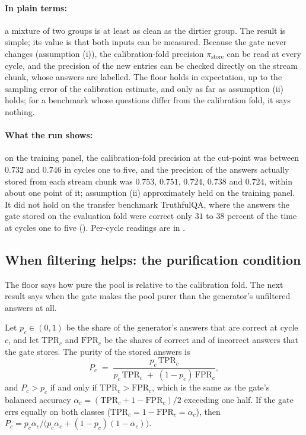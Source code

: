\paragraph{In plain terms:} a mixture of two groups is at least as clean as the dirtier group. The result is simple; its value is that both inputs can be measured. Because the gate never changes (assumption (i)), the calibration-fold precision $\pi_{\text{store}}$ can be read at every cycle, and the precision of the new entries can be checked directly on the stream chunk, whose answers are labelled. The floor holds in expectation, up to the sampling error of the calibration estimate, and only as far as assumption (ii) holds; for a benchmark whose questions differ from the calibration fold, it says nothing.

\paragraph{What the run shows:} on the training panel, the calibration-fold precision at the cut-point was between $0.732$ and $0.746$ in cycles one to five, and the precision of the answers actually stored from each stream chunk was $0.753$, $0.751$, $0.724$, $0.738$ and $0.724$, within about one point of it; assumption (ii) approximately held on the training panel. It did not hold on the transfer benchmark TruthfulQA, where the answers the gate stored on the evaluation fold were correct only $31$ to $38$ percent of the time at cycles one to five (). Per-cycle readings are in .

\subsection{When filtering helps: the purification condition}
\label{sec:theorem-bayes}

The floor says how pure the pool is relative to the calibration fold. The next result says when the gate makes the pool purer than the generator's unfiltered answers at all.

\begin{proposition}
\label{thm:bayes-purity}
Let $p_c \in (0,1)$ be the share of the generator's answers that are correct at cycle $c$, and let $\mathrm{TPR}_c$ and $\mathrm{FPR}_c$ be the shares of correct and of incorrect answers that the gate stores. The purity of the stored answers is
\begin{equation}
P_c \;=\; \frac{p_c \, \mathrm{TPR}_c}{p_c \, \mathrm{TPR}_c \;+\; (1-p_c) \, \mathrm{FPR}_c},
\label{eq:bayes-purity}
\end{equation}
and $P_c > p_c$ if and only if $\mathrm{TPR}_c > \mathrm{FPR}_c$, which is the same as the gate's balanced accuracy $\alpha_c = (\mathrm{TPR}_c + 1 - \mathrm{FPR}_c)/2$ exceeding one half. If the gate errs equally on both classes ($\mathrm{TPR}_c = 1-\mathrm{FPR}_c = \alpha_c$), then $P_c = p_c \alpha_c / \big(p_c \alpha_c + (1-p_c)(1-\alpha_c)\big)$.
\end{proposition}

